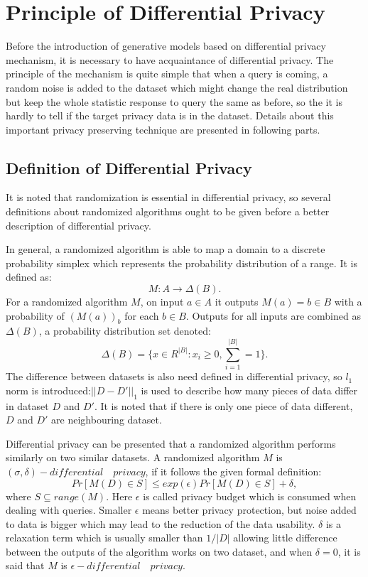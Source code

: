 \documentclass[conference]{IEEEtran}
\begin{document}
\section{Principle of Differential Privacy}
Before the introduction of generative models based on differential privacy mechanism, it is necessary to have acquaintance of differential privacy. The principle of the mechanism is quite simple that when a query is coming, a random noise is added to the dataset which might change the real distribution but keep the whole statistic response to query the same as before, so the it is hardly to tell if the target privacy data is in the dataset. Details about this important privacy preserving technique are presented in following parts.

\subsection{Definition of Differential Privacy}
It is noted that randomization is essential in differential privacy, so several definitions about randomized algorithms ought to be given before a better description of differential privacy.\cite{b2}

In general, a randomized algorithm is able to map a domain to a discrete probability simplex which represents the probability distribution of a range. It is defined as:
\begin{equation}
    M: A \longrightarrow \Delta(B).
\end{equation}
For a randomized algorithm $M$, on input $a \in A$ it outputs $M(a) = b \in B$ with a probability of $(M(a))_b$ for each $b \in B$. Outputs for all inputs are combined as $\Delta(B)$, a probability distribution set denoted:
\begin{equation}
    \Delta(B) = \{x \in R^{|B|}: x_i \geq 0, \sum_{i=1}^{|B|} = 1 \}.
\end{equation}
The difference between datasets is also need defined in differential privacy, so $l_1$ norm is introduced:$||D - D'||_1$ is used to describe how many pieces of data differ in dataset $D$ and $D'$. It is noted that if there is only one piece of data different, $D$ and $D'$ are neighbouring dataset.

Differential privacy can be presented that a randomized algorithm performs similarly on two similar datasets. A randomized algorithm $M$ is $(\sigma,\delta)-differential \quad privacy$, if it follows the given formal definition:
\begin{equation}
    Pr[M(D) \in S] \leq exp(\epsilon) Pr[M(D) \in S] + \delta,
\end{equation}
where $S \subseteq range(M)$. Here $\epsilon$ is called privacy budget which is consumed when dealing with queries. Smaller $\epsilon$ means better privacy protection, but noise added to data is bigger which may lead to the reduction of the data usability. $\delta$ is a relaxation term which is usually smaller than $1/|D|$ allowing little difference between the outputs of the algorithm works on two dataset, and when $\delta = 0$, it is said that $M$ is $\epsilon-differential \quad privacy$.
\end{document}
